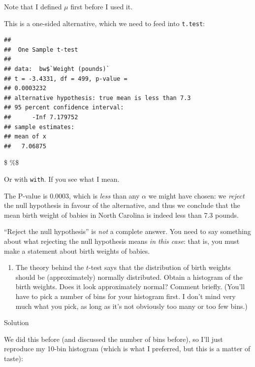 \documentclass[]{tufte-book}
\newenvironment{Shaded}{}{}
\newcommand{\DataTypeTok}[1]{\textcolor[rgb]{0.56,0.13,0.00}{#1}}
\newcommand{\FloatTok}[1]{\textcolor[rgb]{0.25,0.63,0.44}{#1}}
\newcommand{\KeywordTok}[1]{\textcolor[rgb]{0.00,0.44,0.13}{\textbf{#1}}}
\newcommand{\NormalTok}[1]{#1}
\newcommand{\OperatorTok}[1]{\textcolor[rgb]{0.40,0.40,0.40}{#1}}
\newcommand{\StringTok}[1]{\textcolor[rgb]{0.25,0.44,0.63}{#1}}
\providecommand{\tightlist}{%
  \setlength{\itemsep}{0pt}\setlength{\parskip}{0pt}}
\theoremstyle{definition}
\theoremstyle{definition}
\theoremstyle{definition}
\theoremstyle{remark}
\begin{document}
Note that I defined \(\mu\) first before I used it.

This is a one-sided alternative, which we need to feed into
\texttt{t.test}:

\begin{Shaded}
\end{Shaded}

\begin{verbatim}
## 
##  One Sample t-test
## 
## data:  bw$`Weight (pounds)`
## t = -3.4331, df = 499, p-value =
## 0.0003232
## alternative hypothesis: true mean is less than 7.3
## 95 percent confidence interval:
##      -Inf 7.179752
## sample estimates:
## mean of x 
##   7.06875
\end{verbatim}

\$ \%\$

Or with \texttt{with}. If you see what I mean.

The P-value is 0.0003, which is \emph{less} than any \(\alpha\) we might
have chosen: we \emph{reject} the null hypothesis in favour of the
alternative, and thus we conclude that the mean birth weight of babies
in North Carolina is indeed less than 7.3 pounds.

``Reject the null hypothesis'' is \emph{not} a complete answer. You need
to say something about what rejecting the null hypothesis means \emph{in
this case}: that is, you must make a statement about birth weights of
babies.

\begin{enumerate}
\def\labelenumi{(\alph{enumi})}
\setcounter{enumi}{3}
\tightlist
\item
  The theory behind the \(t\)-test says that the distribution of birth
  weights should be (approximately) normally distributed. Obtain a
  histogram of the birth weights. Does it look approximately normal?
  Comment briefly. (You'll have to pick a number of bins for your
  histogram first. I don't mind very much what you pick, as long as it's
  not obviously too many or too few bins.)
\end{enumerate}

Solution

We did this before (and discussed the number of bins before), so I'll
just reproduce my 10-bin histogram (which is what I preferred, but this
is a matter of taste):
\end{document}
